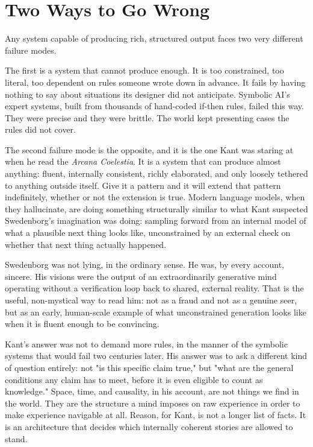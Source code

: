 \section*{Two Ways to Go Wrong}

Any system capable of producing rich, structured output faces two very different failure modes.

The first is a system that cannot produce enough. It is too constrained, too literal, too dependent on rules someone wrote down in advance. It fails by having nothing to say about situations its designer did not anticipate. Symbolic AI's expert systems, built from thousands of hand-coded if-then rules, failed this way. They were precise and they were brittle. The world kept presenting cases the rules did not cover.

The second failure mode is the opposite, and it is the one Kant was staring at when he read the \emph{Arcana Coelestia}. It is a system that can produce almost anything: fluent, internally consistent, richly elaborated, and only loosely tethered to anything outside itself. Give it a pattern and it will extend that pattern indefinitely, whether or not the extension is true. Modern language models, when they hallucinate, are doing something structurally similar to what Kant suspected Swedenborg's imagination was doing: sampling forward from an internal model of what a plausible next thing looks like, unconstrained by an external check on whether that next thing actually happened.

Swedenborg was not lying, in the ordinary sense. He was, by every account, sincere. His visions were the output of an extraordinarily generative mind operating without a verification loop back to shared, external reality. That is the useful, non-mystical way to read him: not as a fraud and not as a genuine seer, but as an early, human-scale example of what unconstrained generation looks like when it is fluent enough to be convincing.

Kant's answer was not to demand more rules, in the manner of the symbolic systems that would fail two centuries later. His answer was to ask a different kind of question entirely: not "is this specific claim true," but "what are the general conditions any claim has to meet, before it is even eligible to count as knowledge." Space, time, and causality, in his account, are not things we find in the world. They are the structure a mind imposes on raw experience in order to make experience navigable at all. Reason, for Kant, is not a longer list of facts. It is an architecture that decides which internally coherent stories are allowed to stand.

